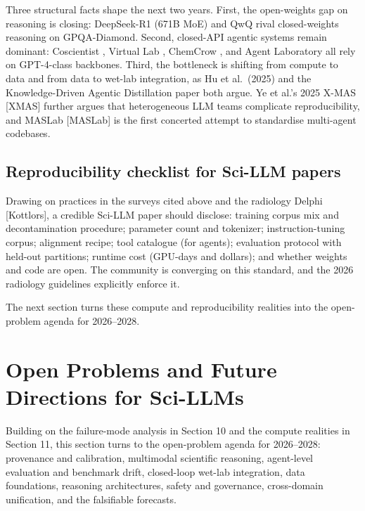 \documentclass{article}
\begin{document}
Three structural facts shape the next two years. First, the open-weights gap on reasoning is closing: DeepSeek-R1 (671B MoE) and QwQ rival closed-weights reasoning on GPQA-Diamond. Second, closed-API agentic systems remain dominant: Coscientist \cite{boiko2023nature6242023}, Virtual Lab \cite{swanson2024thevirtuallabaiage}, ChemCrow \cite{bran2024naturemachineintel}, and Agent Laboratory \cite{schmidgall2025agentlaboratoryusi} all rely on GPT-4-class backbones. Third, the bottleneck is shifting from compute to data and from data to wet-lab integration, as Hu et al.~(2025) \cite{hu2025asurveyofscientifi} and the Knowledge-Driven Agentic Distillation paper \cite{xiao2025knowledgedrivenage} both argue. Ye et al.'s 2025 X-MAS {[}XMAS{]} further argues that heterogeneous LLM teams complicate reproducibility, and MASLab {[}MASLab{]} is the first concerted attempt to standardise multi-agent codebases.

\subsection{Reproducibility checklist for Sci-LLM papers}\label{reproducibility-checklist-for-sci-llm-papers}

Drawing on practices in the surveys cited above \cite{zhang2025scientificlargelan,luo2025llm4srasurveyonlar,wei2025fromaiforscienceto,zheng2025fromautomationtoau,hu2025asurveyofscientifi} and the radiology Delphi {[}Kottlors{]}, a credible Sci-LLM paper should disclose: training corpus mix and decontamination procedure; parameter count and tokenizer; instruction-tuning corpus; alignment recipe; tool catalogue (for agents); evaluation protocol with held-out partitions; runtime cost (GPU-days and dollars); and whether weights and code are open. The community is converging on this standard, and the 2026 radiology guidelines explicitly enforce it.

The next section turns these compute and reproducibility realities into the open-problem agenda for 2026--2028.

\section{Open Problems and Future Directions for Sci-LLMs}\label{open-problems-and-future-directions-for-sci-llms}

Building on the failure-mode analysis in Section 10 and the compute realities in Section 11, this section turns to the open-problem agenda for 2026--2028: provenance and calibration, multimodal scientific reasoning, agent-level evaluation and benchmark drift, closed-loop wet-lab integration, data foundations, reasoning architectures, safety and governance, cross-domain unification, and the falsifiable forecasts.
\end{document}
